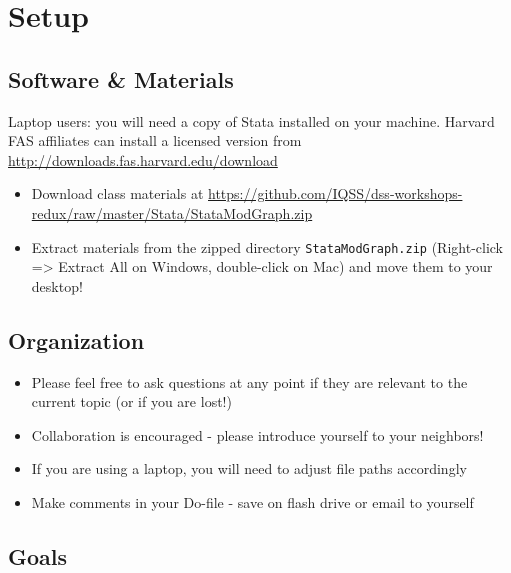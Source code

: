 \documentclass[]{book}
\providecommand{\tightlist}{%
  \setlength{\itemsep}{0pt}\setlength{\parskip}{0pt}}
\begin{document}
\section{Setup}\label{setup-8}

\subsection{Software \& Materials}\label{software-materials-8}

Laptop users: you will need a copy of Stata installed on your machine.
Harvard FAS affiliates can install a licensed version from
\url{http://downloads.fas.harvard.edu/download}

\begin{itemize}
\tightlist
\item
  Download class materials at
  \url{https://github.com/IQSS/dss-workshops-redux/raw/master/Stata/StataModGraph.zip}
\item
  Extract materials from the zipped directory \texttt{StataModGraph.zip}
  (Right-click =\textgreater{} Extract All on Windows, double-click on
  Mac) and move them to your desktop!
\end{itemize}

\subsection{Organization}\label{organization-2}

\begin{itemize}
\tightlist
\item
  Please feel free to ask questions at any point if they are relevant to
  the current topic (or if you are lost!)
\item
  Collaboration is encouraged - please introduce yourself to your
  neighbors!
\item
  If you are using a laptop, you will need to adjust file paths
  accordingly
\item
  Make comments in your Do-file - save on flash drive or email to
  yourself
\end{itemize}

\subsection{Goals}\label{goals-8}
\end{document}

